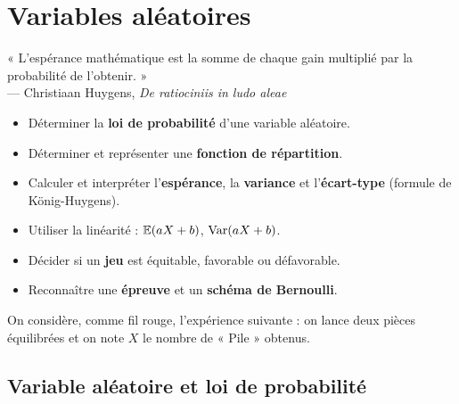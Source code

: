 \chapter{Variables aléatoires}

\begin{citationchapitre}
	« L'espérance mathématique est la somme de chaque gain multiplié par la
	probabilité de l'obtenir. »\\[0.4em]
	— Christiaan Huygens, \emph{De ratiociniis in ludo aleae}
\end{citationchapitre}

\begin{objectifs}
	\begin{itemize}[label=\textbullet]
		\item Déterminer la \textbf{loi de probabilité} d'une variable
		aléatoire.
		\item Déterminer et représenter une \textbf{fonction de répartition}.
		\item Calculer et interpréter l'\textbf{espérance}, la
		\textbf{variance} et l'\textbf{écart-type} (formule de
		König-Huygens).
		\item Utiliser la linéarité : $\mathbb{E}(aX+b)$, $\mathrm{Var}(aX+b)$.
		\item Décider si un \textbf{jeu} est équitable, favorable ou
		défavorable.
		\item Reconnaître une \textbf{épreuve} et un \textbf{schéma de
		Bernoulli}.
	\end{itemize}
\end{objectifs}

On considère, comme fil rouge, l'expérience suivante : on lance deux pièces
équilibrées et on note $X$ le nombre de « Pile » obtenus.


\section{Variable aléatoire et loi de probabilité}


